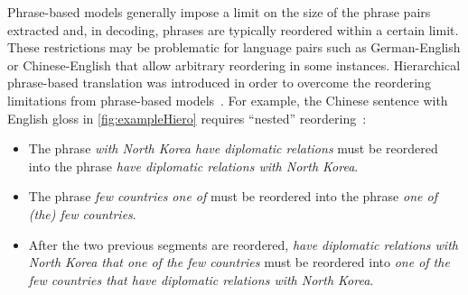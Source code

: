 Phrase-based models generally impose a limit on the size
of the phrase pairs extracted and, in decoding, phrases
are typically reordered within a certain limit.
These restrictions may be problematic for language pairs
such as German-English or Chinese-English that allow
arbitrary reordering in some instances.
Hierarchical phrase-based translation was introduced
in order to overcome the reordering limitations from
phrase-based models~\citep{chiang:2005:ACL,chiang:2007:CL}.
For example, the Chinese sentence with English gloss
in \autoref{fig:exampleHiero} requires ``nested'' reordering~\citep{chiang:2007:CL}:
%
\begin{itemize}
  \item The phrase \emph{with North Korea have diplomatic relations} must be reordered into
    the phrase \emph{have diplomatic relations with North Korea}.
  \item The phrase \emph{few countries one of} must be reordered into the phrase \emph{one of (the) few countries}.
  \item After the two previous segments are reordered, \emph{have diplomatic relations with North Korea that one of the few countries} must be reordered into \emph{one of the few countries that have diplomatic relations with North Korea}.
\end{itemize}
%
